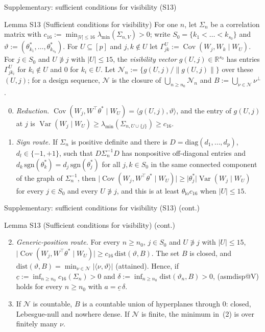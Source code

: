 \documentclass[aspectratio=169]{beamer}
\makeatletter
\newcommand{\asmdisp}[1]{\csname asmdisp@#1\endcsname}
\newcommand{\as}[1]{\textup{(\asmdisp{#1})}}
\newcommand{\R}{\mathbb{R}}
\newcommand{\set}[1]{[#1]}
\newcommand{\abs}[1]{\lvert #1\rvert}
\newcommand{\norm}[1]{\lVert #1\rVert}
\DeclareMathOperator{\Var}{Var}
\DeclareMathOperator{\Cov}{Cov}
\newcommand{\lmin}{\lambda_{\min}}
\newcommand{\tstar}{\theta^*}
\newcommand{\Sz}{S_0}
\newcommand{\sz}{s_0}
\newcommand{\Sig}{\Sigma_n}
\makeatother
\begin{document}
\begin{frame}{Supplementary: sufficient conditions for visibility (S13)}
\footnotesize
\begin{block}{Lemma S13 (Sufficient conditions for visibility)}
For one $n$, let $\Sig$ be a correlation matrix with $c_{16}:=\min_{\abs{V}\le16}\lmin(\Sigma_{n,V})>0$; write
$\Sz=\{k_1<\dots<k_{\sz}\}$ and $\vartheta:=(\theta^*_{k_1},\dots,\theta^*_{k_{\sz}})$. For $U\subseteq\set p$ and $j,k\notin U$
let $\Gamma^U_{jk}:=\Cov(W_j,W_k\mid W_U)$. For $j\in\Sz$ and $U\not\ni j$ with $\abs{U}\le15$, the \emph{visibility vector}
$g(U,j)\in\R^{\sz}$ has entries $\Gamma^U_{jk_i}$ for $k_i\notin U$ and $0$ for $k_i\in U$. Let
$\mathcal N_n:=\{g(U,j)/\norm{g(U,j)}\}$ over these $(U,j)$; for a design sequence, $\mathcal N$ is the closure of
$\bigcup_{n\ge n_0}\mathcal N_n$ and $B:=\bigcup_{\nu\in\mathcal N}\nu^\perp$.
\begin{enumerate}[(1)]
  \setcounter{enumi}{-1}
  \item \emph{Reduction.} $\Cov(W_j,W^\top\tstar\mid W_U)=\langle g(U,j),\vartheta\rangle$, and the entry of $g(U,j)$ at $j$ is
    $\Var(W_j\mid W_U)\ge\lmin(\Sigma_{n,U\cup\{j\}})\ge c_{16}$.
  \item \emph{Sign route.} If $\Sig$ is positive definite and there is $D=\mathrm{diag}(d_1,\dots,d_p)$, $d_l\in\{-1,+1\}$,
    such that $D\Sig^{-1}D$ has nonpositive off-diagonal entries and $d_k\,\mathrm{sgn}(\theta^*_k)=d_j\,\mathrm{sgn}(\theta^*_j)$
    for all $j,k\in\Sz$ in the same connected component of the graph of $\Sig^{-1}$, then
    $\abs{\Cov(W_j,W^\top\tstar\mid W_U)}\ge\abs{\theta^*_j}\Var(W_j\mid W_U)$ for every $j\in\Sz$ and every $U\not\ni j$, and
    this is at least $\theta_{\mathrm{lo}}c_{16}$ when $\abs{U}\le15$.
\end{enumerate}
\end{block}
\end{frame}

\begin{frame}{Supplementary: sufficient conditions for visibility (S13) (cont.)}
\footnotesize
\begin{block}{Lemma S13 (Sufficient conditions for visibility) (cont.)}
\begin{enumerate}[(1)]\setcounter{enumi}{1}
  \item \emph{Generic-position route.} For every $n\ge n_0$, $j\in\Sz$ and $U\not\ni j$ with $\abs{U}\le15$,
    $\abs{\Cov(W_j,W^\top\tstar\mid W_U)}\ge c_{16}\,\mathrm{dist}(\vartheta,B)$. The set $B$ is closed, and
    $\mathrm{dist}(\vartheta,B)=\min_{\nu\in\mathcal N}\abs{\langle\nu,\vartheta\rangle}$ (attained). Hence, if
    $\underline c:=\inf_{n\ge n_0}c_{16}(\Sig)>0$ and $\delta:=\inf_{n\ge n_0}\mathrm{dist}(\vartheta_n,B)>0$, \as{V} holds for
    every $n\ge n_0$ with $a=\underline c\,\delta$.
  \item If $\mathcal N$ is countable, $B$ is a countable union of hyperplanes through $0$: closed, Lebesgue-null and
    nowhere dense. If $\mathcal N$ is finite, the minimum in~(2) is over finitely many $\nu$.
\end{enumerate}
\end{block}
\end{frame}
\end{document}
